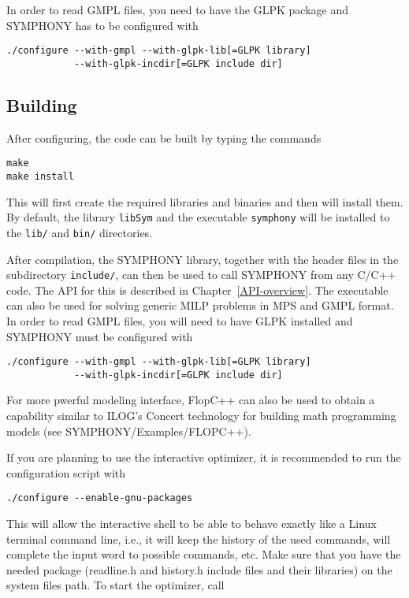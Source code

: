 In order to read GMPL files, you need to have the GLPK package and SYMPHONY
has to be configured with
\begin{verbatim}
./configure --with-gmpl --with-glpk-lib[=GLPK library] 
            --with-glpk-incdir[=GLPK include dir] 
\end{verbatim}

\subsection{Building}

After configuring, the code can be built by typing the commands
\begin{verbatim}
make
make install
\end{verbatim}
This will first create the required libraries and binaries and then will
install them. By default, the library \texttt{libSym} and the executable
\texttt{symphony} will be installed to the \texttt{lib/} and \texttt{bin/}
directories.

After compilation, the SYMPHONY library, together with the header files in the
subdirectory \texttt{include/}, can then be used to call SYMPHONY from any
C/C++ code. The API for this is described in Chapter~\ref{API-overview}. The
executable can also be used for solving generic MILP problems in MPS and GMPL
format. In order to read GMPL files, you will need to have GLPK installed and
SYMPHONY must be configured with
\begin{verbatim}
./configure --with-gmpl --with-glpk-lib[=GLPK library] 
            --with-glpk-incdir[=GLPK include dir] 
\end{verbatim}

For more pwerful modeling interface, FlopC++ can also be used to obtain a
capability similar to ILOG's Concert technology for building math programming
models (see SYMPHONY/Examples/FLOPC++). 

If you are planning to use the interactive optimizer, it is recommended to run
the configuration script with
\begin{verbatim}
./configure --enable-gnu-packages 
\end{verbatim}
This will allow the interactive shell to be able to behave exactly like 
a Linux terminal command line, i.e., it will keep the history of the used 
commands, will complete the input word to possible commands, etc. Make sure
that you have the needed package (readline.h and history.h include files 
and their libraries) on the system files path. To start the optimizer, call 

